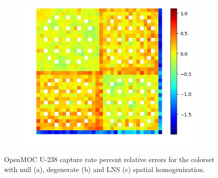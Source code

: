 \begin{figure}[H]
\begin{subfigure}{0.45\textwidth}
  \centering
  \includegraphics[width=\linewidth]{figures/reflector/capt-lns-errors}
  \caption{}
  \label{fig:reflector-capt-lns-error}
\end{subfigure}
\caption{OpenMOC U-238 capture rate percent relative errors for the colorset with null (a), degenerate (b) and LNS (c) spatial homogenization.}
\label{fig:reflector-capt-errors}
\end{figure}
